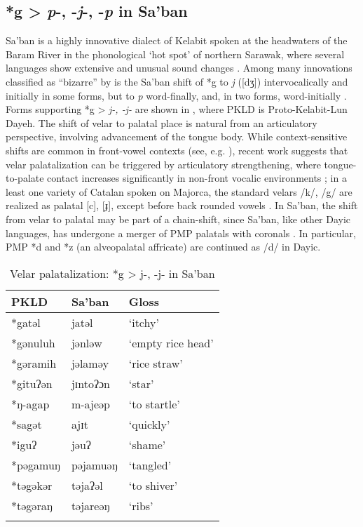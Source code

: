 \documentclass[output=paper]{langscibook}
\begin{document}
\subsection{*g > \textit{p}-, -\textit{j}-, -\textit{p} in Sa’ban}\label{sec:blevins:3.1}
\largerpage
Sa’ban is a highly innovative dialect of Kelabit spoken at the headwaters of the Baram River in the phonological ‘hot spot’ of northern Sarawak, where several languages show extensive and unusual sound changes \citep{Blust2001}. Among many innovations classified as “bizarre” by \citet{Blust2005} is the Sa’ban shift of *g to \textit{j} ([dʒ]) intervocalically and initially in some forms, but to \textit{p} word-finally, and, in two forms, word-initially \parencites[255--257]{Blust2005}[28--29]{Blust2018}. Forms supporting *g > \textit{j-, -j-} are shown in , where PKLD is Proto-Kelabit-Lun Dayeh. The shift of velar to palatal place is natural from an articulatory perspective, involving advancement of the tongue body. While context-sensitive shifts are common in front-vowel contexts (see, e.g. \citealt[215--216]{Kümmel2007}), recent work suggests that velar palatalization can be triggered by articulatory strengthening, where tongue-to-palate contact increases significantly in non-front vocalic environments \citep{Recasens2020}; in a least one variety of Catalan spoken on Majorca, the standard velars \mbox{/k/}, \mbox{/g/} are realized as palatal [c], [ɟ], except before back rounded vowels \citep[10]{Wheeler2005}. In Sa’ban, the shift from velar to palatal may be part of a chain-shift, since Sa’ban, like other Dayic languages, has undergone a merger of PMP palatals with coronals \citep{Smith2017}. In particular, PMP *d and *z (an alveopalatal affricate) are continued as \mbox{/d/} in Dayic.

\begin{table}
\begin{tabularx}{\textwidth}{XXX}
\lsptoprule
{PKLD} & {Sa’ban} & {Gloss}\\
\midrule
*gatəl & jatəl      & `itchy'\\
*gənuluh & jənləw   & `empty rice head'\\
*gəramih & jəlaməy  & `rice straw'\\
*gituʔən & jɪntoʔɔn & `star'\\
*ŋ-agap & m-ajeəp   & `to startle'\\
*sagət & ajɪt       & `quickly'\\
*iguʔ & jəuʔ        & `shame'\\
*pəgamuŋ & pəjamuəŋ & `tangled'\\
*təgəkər & təjaʔəl  & `to shiver'\\
*təgəraŋ & təjareəŋ & `ribs'\\
\lspbottomrule
\end{tabularx}
\caption{\label{tab:blevins:8}Velar palatalization: *g > j-, -j- in Sa’ban \citep[28--29]{Blust2018}}
\end{table}
\end{document}
